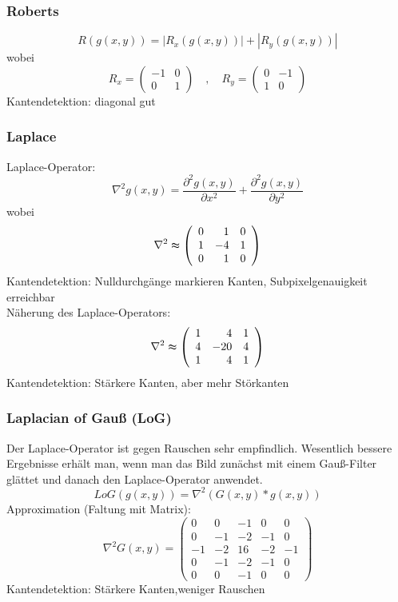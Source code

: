 \subsubsection{Roberts}

$$R(g(x,y)) = |R_x(g(x,y))| + |R_y(g(x,y))|$$ wobei $$R_x = \left( \begin{array}{rr} -1 & 0 \\ 0 & 1 \end{array} \right) \quad , \quad R_y = \left( \begin{array}{rr} 0 & -1 \\ 1 & 0 \end{array} \right)$$
Kantendetektion: diagonal gut

\subsubsection*{Laplace}

Laplace-Operator: $$\nabla^2 g(x,y) = \frac{\partial^2 g(x,y)}{\partial x^2} + \frac{\partial^2 g(x,y)}{\partial y^2}$$ wobei $$\nabla^2 \thickapprox \left( \begin{array}{rrr} 0 & 1 & 0 \\ 1 & -4 & 1 \\ 0 & 1 & 0 \end{array} \right)$$
Kantendetektion: Nulldurchgänge markieren Kanten, Subpixelgenauigkeit erreichbar \\ Näherung des Laplace-Operators: $$\nabla^2 \thickapprox \left( \begin{array}{rrr} 1 & 4 & 1 \\ 4 & -20 & 4 \\ 1 & 4 & 1 \end{array} \right)$$
Kantendetektion: Stärkere Kanten, aber mehr Störkanten

\subsubsection{Laplacian of Gauß (LoG)}

Der Laplace-Operator ist gegen Rauschen sehr empfindlich. Wesentlich bessere Ergebnisse erhält man, wenn man das Bild zunächst mit einem Gauß-Filter glättet und danach den Laplace-Operator anwendet. $$LoG(g(x,y)) = \nabla^2 (G(x,y) * g(x,y))$$ Approximation (Faltung mit Matrix): $$\nabla^2 G(x,y) = \left( \begin{array}{rrrrr} 0 & 0 & -1 & 0 & 0 \\ 0 & -1 & -2 & -1 & 0 \\ -1 & -2 & 16 & -2 & -1 \\ 0 & -1 & -2 & -1 & 0 \\ 0 & 0 & -1 & 0 & 0 \end{array} \right)$$
Kantendetektion: Stärkere Kanten,weniger Rauschen

